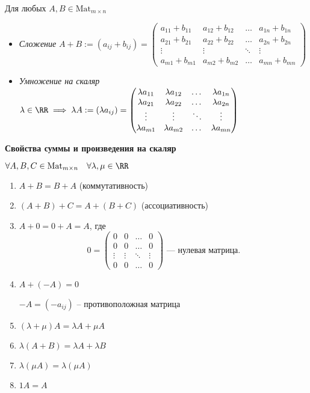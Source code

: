 Для любых $A, B \in \text{Mat}_{m \times n}$
\begin{itemize}
    \item \emph{Сложение} $A + B := (a_{ij} + b_{ij}) = \begin{pmatrix}
            a_{11} + b_{11} & a_{12} + b_{12} & \dots & a_{1n} + b_{1n} \\
            a_{21} + b_{21} & a_{22} + b_{22} & \dots & a_{2n} + b_{2n} \\
            \vdots & \vdots & \ddots & \vdots \\
            a_{m1} + b_{m1} & a_{m2} + b_{m2} & \dots & a_{mn} + b_{mn}
        \end{pmatrix}$
    \item \emph{Умножение на скаляр} $\lambda \in \RR \implies \lambda A := (\lambda a_{ij}) = \begin{pmatrix}
            \lambda a_{11} & \lambda a_{12} & \dots & \lambda a_{1n} \\
            \lambda a_{21} & \lambda a_{22} & \dots & \lambda a_{2n} \\
            \vdots & \vdots & \ddots & \vdots \\
            \lambda a_{m1} & \lambda a_{m2} & \dots & \lambda a_{mn}
        \end{pmatrix}$
\end{itemize}

\textbf{Свойства суммы и произведения на скаляр}

$\forall A, B, C  \in \text{Mat}_{m \times n} \quad \forall \lambda, \mu \in \RR$
\begin{enumerate}[label=\arabic*), nosep]
    \item $A + B = B + A$ (коммутативность)

    \item $(A + B) + C = A + (B + C)$ (ассоциативность)

    \item $A + 0 = 0 + A = A$, где 
        \begin{equation*}
            0 = \begin{pmatrix}
                0 & 0 & \dots & 0 \\
                0 & 0 & \dots & 0 \\
                \vdots & \vdots & \ddots & \vdots \\
                0 & 0 & \dots & 0
            \end{pmatrix} \text{ --- нулевая матрица}
        .\end{equation*}

    \item $A + (-A) = 0$
    
        $-A = (-a_{ij})$ -- противоположная матрица

    \item $(\lambda + \mu) A = \lambda A + \mu A$

    \item $\lambda (A + B) = \lambda A + \lambda B$

    \item $\lambda (\mu A) = \lambda (\mu A)$

    \item $1 A = A$
\end{enumerate}

